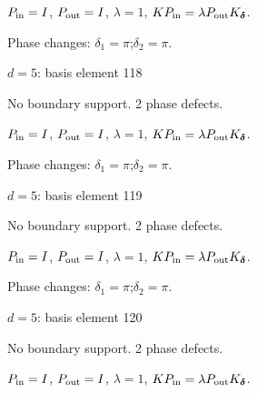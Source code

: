 \vspace{-1mm}
$P_{\rm in}=I$, \quad $P_{\rm out}=I$, \quad $\lambda=1$, \qquad $K P_{\rm in}=\lambda P_{\rm out}K_{\boldsymbol\delta}$.
\par\smallskip\begin{minipage}{.98\linewidth}\small Phase changes: $\delta_{1}=\pi$;\quad $\delta_{2}=\pi$.\end{minipage}
\vfill
{\footnotesize\texttt{}}
\newpage
{}
{\Large $d=5$: basis element 118}\par
No boundary support. 2 phase defects.
\begin{center}
\end{center}
\vspace{-1mm}
$P_{\rm in}=I$, \quad $P_{\rm out}=I$, \quad $\lambda=1$, \qquad $K P_{\rm in}=\lambda P_{\rm out}K_{\boldsymbol\delta}$.
\par\smallskip\begin{minipage}{.98\linewidth}\small Phase changes: $\delta_{1}=\pi$;\quad $\delta_{2}=\pi$.\end{minipage}
\vfill
{\footnotesize\texttt{}}
\newpage
{}
{\Large $d=5$: basis element 119}\par
No boundary support. 2 phase defects.
\begin{center}
\end{center}
\vspace{-1mm}
$P_{\rm in}=I$, \quad $P_{\rm out}=I$, \quad $\lambda=1$, \qquad $K P_{\rm in}=\lambda P_{\rm out}K_{\boldsymbol\delta}$.
\par\smallskip\begin{minipage}{.98\linewidth}\small Phase changes: $\delta_{1}=\pi$;\quad $\delta_{2}=\pi$.\end{minipage}
\vfill
{\footnotesize\texttt{}}
\newpage
{}
{\Large $d=5$: basis element 120}\par
No boundary support. 2 phase defects.
\begin{center}
\end{center}
\vspace{-1mm}
$P_{\rm in}=I$, \quad $P_{\rm out}=I$, \quad $\lambda=1$, \qquad $K P_{\rm in}=\lambda P_{\rm out}K_{\boldsymbol\delta}$.
